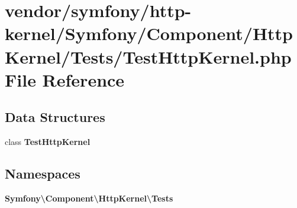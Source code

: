 \section{vendor/symfony/http-\/kernel/\+Symfony/\+Component/\+Http\+Kernel/\+Tests/\+Test\+Http\+Kernel.php File Reference}
\label{_test_http_kernel_8php}
\subsection*{Data Structures}
\begin{DoxyCompactItemize}
\item 
class {\bf Test\+Http\+Kernel}
\end{DoxyCompactItemize}
\subsection*{Namespaces}
\begin{DoxyCompactItemize}
\item 
 {\bf Symfony\textbackslash{}\+Component\textbackslash{}\+Http\+Kernel\textbackslash{}\+Tests}
\end{DoxyCompactItemize}
